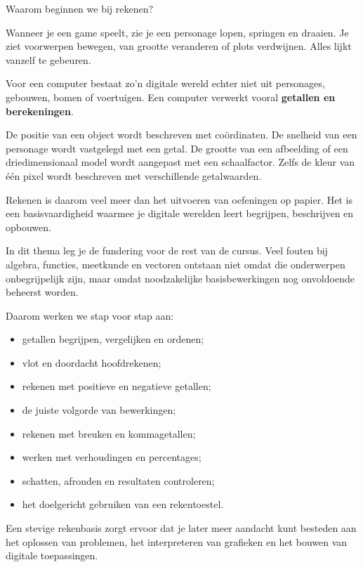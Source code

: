 \documentclass{xourse}
\begin{document}
\begin{themaintro}{Waarom beginnen we bij rekenen?}

Wanneer je een game speelt, zie je een personage lopen, springen en draaien.
Je ziet voorwerpen bewegen, van grootte veranderen of plots verdwijnen.
Alles lijkt vanzelf te gebeuren.

Voor een computer bestaat zo'n digitale wereld echter niet uit personages,
gebouwen, bomen of voertuigen. Een computer verwerkt vooral
\textbf{getallen en berekeningen}.

De positie van een object wordt beschreven met coördinaten.
De snelheid van een personage wordt vastgelegd met een getal.
De grootte van een afbeelding of een driedimensionaal model wordt aangepast
met een schaalfactor. Zelfs de kleur van één pixel wordt beschreven met
verschillende getalwaarden.

Rekenen is daarom veel meer dan het uitvoeren van oefeningen op papier.
Het is een basisvaardigheid waarmee je digitale werelden leert begrijpen,
beschrijven en opbouwen.

In dit thema leg je de fundering voor de rest van de cursus. Veel fouten bij
algebra, functies, meetkunde en vectoren ontstaan niet omdat die onderwerpen
onbegrijpelijk zijn, maar omdat noodzakelijke basisbewerkingen nog
onvoldoende beheerst worden.

Daarom werken we stap voor stap aan:

\begin{itemize}
  \item getallen begrijpen, vergelijken en ordenen;
  \item vlot en doordacht hoofdrekenen;
  \item rekenen met positieve en negatieve getallen;
  \item de juiste volgorde van bewerkingen;
  \item rekenen met breuken en kommagetallen;
  \item werken met verhoudingen en percentages;
  \item schatten, afronden en resultaten controleren;
  \item het doelgericht gebruiken van een rekentoestel.
\end{itemize}

Een stevige rekenbasis zorgt ervoor dat je later meer aandacht kunt besteden
aan het oplossen van problemen, het interpreteren van grafieken en het bouwen
van digitale toepassingen.

\end{themaintro}
\end{document}
